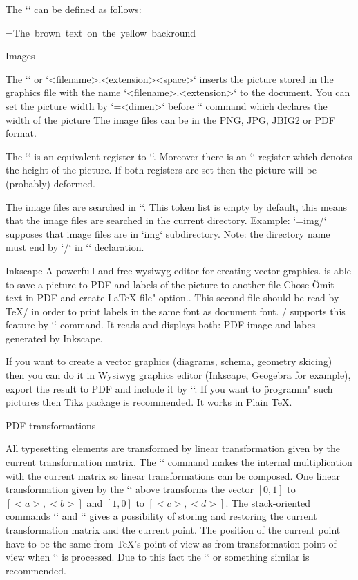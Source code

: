 {The `` can be defined as follows:

\begtt
\def\coloron#1#2#3{%
   \setbox0=\hbox{#3}\leavevmode
   {\rlap{#1\strut \vrule width\wd0}#2}%
}
\coloron\Yellow\Brown{The brown text on the yellow backround}
\endtt

\secc Images

The `` or
`\inspic <filename>.<extension><space>`
inserts the picture stored in
the graphics file with the name `<filename>.<extension>` to the document. 
You can set the picture width by `\picw=<dimen>`
before `\inspic` command which declares the width of the picture 
The image files can be in the PNG, JPG, JBIG2 or PDF format. 

The `\picwidth` is an equivalent register to `\picw`. Moreover there is an
`\picheight` register which denotes the height of the picture. If both
registers are set then the picture will be (probably) deformed. 

The image files are searched in `\picdir`. This token list is empty 
by default, this means that the image files are searched in the 
current directory. Example: `\picdir={img/}` supposes that image files are
in `img` subdirectory. Note: the directory name must end by `/` in `\picdir`
declaration.

Inkscape\fnote
{A powerfull and free wysiwyg editor for creating vector graphics.} 
is able to save a picture to PDF and labels of the picture to another
file\fnote
{Chose \"Omit text in PDF and create LaTeX file" option.}. 
This second file should be read by \TeX/ in order to print labels
in the same font as document font. \OpTeX/ supports this feature by
`` command. It reads and displays both: PDF image
and labes generated by Inkscape.

If you want to create a vector graphics (diagrams, schema, geometry
skicing) then you can do it in Wysiwyg graphics editor (Inkscape, Geogebra for
example), export the result to PDF and include it by `\inspic`.
If you want to \"programm" such pictures then Tikz package is recommended.
It works in Plain \TeX. 

\secc PDF transformations

All typesetting elements are transformed by linear
transformation given by the current transformation matrix. The
`` command makes the internal multiplication
with the current matrix so linear transformations can be composed. 
One linear transformation given by the `\pdfsetmatrix` above transforms
the vector $[0,1]$ to $[<a>,<b>]$ and $[1,0]$ to $[<c>,<d>]$.
The stack-oriented commands `\pdfsave` and `\pdfrestore` gives a possibility of
storing and restoring the current transformation matrix and the current point.
The position of the current point have to be the same from \TeX{}'s point of
view as from transformation point of view when `\pdfrestore` is processed.
Due to this fact the `\pdfsave{}\pdfrestore` 
or something similar is recommended.

}
